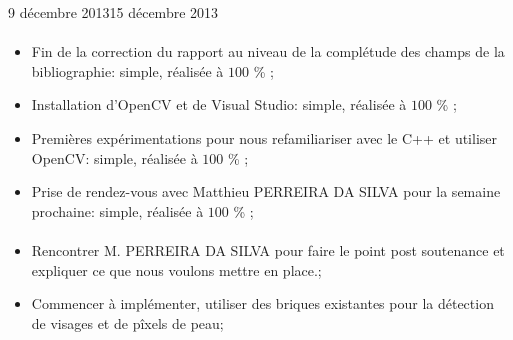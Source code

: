 \documentclass[11pt, french]{report-rd-info}
\begin{document}
\begin{fichesuivi}{9 décembre 2013}{15 décembre 2013}
\paragraph{}
	\begin{travaileffectue}
		\begin{itemize}
			\item Fin de la correction du rapport au niveau de la complétude des champs de la bibliographie:  simple, réalisée à $100$ \% ;
			\item Installation d’OpenCV et de Visual Studio: simple, réalisée à $100$ \% ;
			\item Premières expérimentations pour nous refamiliariser avec le C++ et utiliser OpenCV: simple, réalisée à $100$ \% ;
			\item Prise de rendez-vous avec Matthieu PERREIRA DA SILVA pour la semaine prochaine:  simple, réalisée à $100$ \% ;
		\end{itemize}
	\end{travaileffectue}

\paragraph*{}
	\begin{planification}
		\begin{itemize}
			\item Rencontrer M. PERREIRA DA SILVA pour faire le point post soutenance et expliquer ce que nous voulons mettre en place.;
			\item Commencer à implémenter, utiliser des briques existantes pour la détection de visages et de pîxels de peau;
		\end{itemize}
	\end{planification}
\end{fichesuivi}
\end{document}

